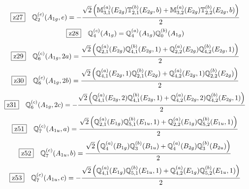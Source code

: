 \documentclass[fleqn,10pt,landscape]{jsarticle}
\begin{document}
\begin{dmath*}
\hspace*{3mm}\fbox{z27}\quad \mathbb{Q}_{2}^{(c)}(A_{1g},e)=- \frac{\sqrt{2} \left(\mathbb{M}_{3,1}^{(a)}(E_{2g}) \mathbb{T}_{2,1}^{(b)}(E_{2g},b) + \mathbb{M}_{3,2}^{(a)}(E_{2g}) \mathbb{T}_{2,2}^{(b)}(E_{2g},b)\right)}{2}
\end{dmath*}
\begin{dmath*}
\hspace*{3mm}\fbox{z28}\quad \mathbb{Q}_{4}^{(c)}(A_{1g})=\mathbb{Q}_{4}^{(a)}(A_{1g}) \mathbb{Q}_{0}^{(b)}(A_{1g})
\end{dmath*}
\begin{dmath*}
\hspace*{3mm}\fbox{z29}\quad \mathbb{Q}_{6}^{(c)}(A_{1g},2a)=\frac{\sqrt{2} \left(\mathbb{Q}_{2,1}^{(a)}(E_{2g}) \mathbb{Q}_{4,1}^{(b)}(E_{2g},1) + \mathbb{Q}_{2,2}^{(a)}(E_{2g}) \mathbb{Q}_{4,2}^{(b)}(E_{2g},1)\right)}{2}
\end{dmath*}
\begin{dmath*}
\hspace*{3mm}\fbox{z30}\quad \mathbb{Q}_{6}^{(c)}(A_{1g},2b)=\frac{\sqrt{2} \left(\mathbb{Q}_{4,1}^{(a)}(E_{2g},1) \mathbb{Q}_{2,1}^{(b)}(E_{2g}) + \mathbb{Q}_{4,2}^{(a)}(E_{2g},1) \mathbb{Q}_{2,2}^{(b)}(E_{2g})\right)}{2}
\end{dmath*}
\begin{dmath*}
\hspace*{3mm}\fbox{z31}\quad \mathbb{Q}_{6}^{(c)}(A_{1g},2c)=- \frac{\sqrt{2} \left(\mathbb{Q}_{4,1}^{(a)}(E_{2g},2) \mathbb{Q}_{4,1}^{(b)}(E_{2g},1) + \mathbb{Q}_{4,2}^{(a)}(E_{2g},2) \mathbb{Q}_{4,2}^{(b)}(E_{2g},1)\right)}{2}
\end{dmath*}
\begin{dmath*}
\hspace*{3mm}\fbox{z51}\quad \mathbb{Q}_{7}^{(c)}(A_{1u},a)=\frac{\sqrt{2} \left(\mathbb{Q}_{2,1}^{(a)}(E_{1g}) \mathbb{Q}_{5,1}^{(b)}(E_{1u},1) + \mathbb{Q}_{2,2}^{(a)}(E_{1g}) \mathbb{Q}_{5,2}^{(b)}(E_{1u},1)\right)}{2}
\end{dmath*}
\begin{dmath*}
\hspace*{3mm}\fbox{z52}\quad \mathbb{Q}_{7}^{(c)}(A_{1u},b)=\frac{\sqrt{2} \left(\mathbb{Q}_{4}^{(a)}(B_{1g}) \mathbb{Q}_{3}^{(b)}(B_{1u}) + \mathbb{Q}_{4}^{(a)}(B_{2g}) \mathbb{Q}_{3}^{(b)}(B_{2u})\right)}{2}
\end{dmath*}
\begin{dmath*}
\hspace*{3mm}\fbox{z53}\quad \mathbb{Q}_{7}^{(c)}(A_{1u},c)=- \frac{\sqrt{2} \left(\mathbb{Q}_{4,1}^{(a)}(E_{1g}) \mathbb{Q}_{5,1}^{(b)}(E_{1u},1) + \mathbb{Q}_{4,2}^{(a)}(E_{1g}) \mathbb{Q}_{5,2}^{(b)}(E_{1u},1)\right)}{2}
\end{dmath*}
\end{document}

